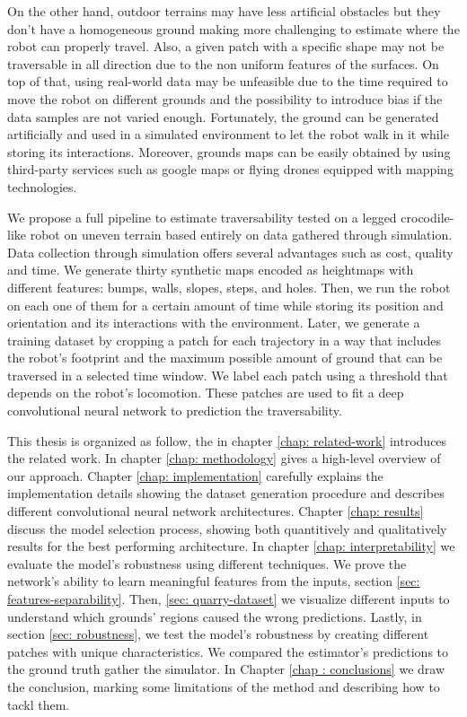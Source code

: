 \documentclass[../document.tex]{subfiles}
\begin{document}
On the other hand, outdoor terrains may have less artificial obstacles but they don't have a homogeneous ground making more challenging to estimate where the robot can properly travel. Also, a given patch with a specific shape may not be traversable in all direction due to the non uniform features of the surfaces. On top of that, using real-world data may be unfeasible due to the time required to move the robot on different grounds and the possibility to introduce bias if the data samples are not varied enough. Fortunately, the ground can be generated artificially and used in a simulated environment to let the robot walk in it while storing its interactions. Moreover, grounds maps can be easily obtained by using third-party services such as google maps or flying drones equipped with mapping technologies.

We propose a full pipeline to estimate traversability tested on a legged crocodile-like robot on uneven terrain based entirely on data gathered through simulation. Data collection through simulation offers several advantages such as cost, quality and time. We generate thirty synthetic maps encoded as heightmaps with different features: bumps, walls, slopes, steps, and holes. Then, we run the robot on each one of them for a certain amount of time while storing its position and orientation and its interactions with the environment. Later, we generate a training dataset by cropping a patch for each trajectory in a way that includes the robot's footprint and the maximum possible amount of ground that can be traversed in a selected time window. We label each patch using a threshold that depends on the robot's locomotion. These patches are used to fit a deep convolutional neural network to prediction the traversability.


This thesis is organized as follow, the in chapter \ref{chap: related-work} introduces the related work. In chapter \ref{chap: methodology} gives a high-level overview of our approach. Chapter \ref{chap: implementation} carefully explains the implementation details showing the dataset generation procedure and describes different convolutional neural network architectures. Chapter \ref{chap: results} discuss the model selection process, showing both quantitively and qualitatively results for the best performing architecture. In chapter \ref{chap: interpretability} we evaluate the model's robustness using different techniques. We prove the network's ability to learn meaningful features from the inputs, section \ref{sec:  features-separability}. Then, \ref{sec: quarry-dataset} we visualize different inputs to understand which grounds' regions caused the wrong predictions. Lastly, in section \ref{sec: robustness}, we test the model's robustness by creating different patches with unique characteristics. We compared the estimator's predictions to the ground truth gather the simulator. In Chapter \ref{chap : conclusions} we draw the conclusion, marking some limitations of the method and describing how to tackl them.
\end{document}
